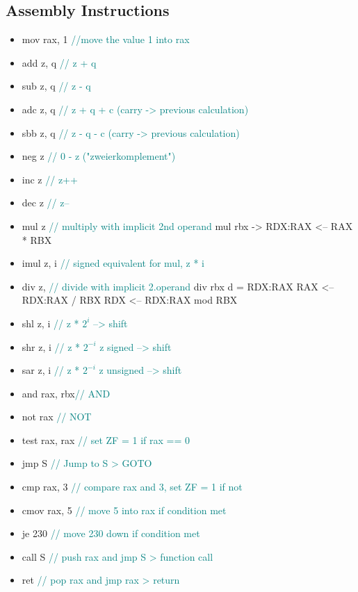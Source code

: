 \begin{multicols*}{4}
\subsection{Assembly Instructions}
\begin{itemize}
    \item mov rax, 1 \textcolor{teal}{//move the value 1 into rax}
    \item add z,   q  \textcolor{teal}{// z + q}
    \item sub z,   q  \textcolor{teal}{// z - q}
    \item adc z,   q  \textcolor{teal}{// z + q + c (carry -> previous calculation)}
    \item sbb z,   q  \textcolor{teal}{// z - q - c (carry -> previous calculation)}
    \item neg z       \textcolor{teal}{// 0 - z ("zweierkomplement")}
    \item inc z       \textcolor{teal}{// z++ }
    \item dec z       \textcolor{teal}{// z-- }
    \item mul z       \textcolor{teal}{// multiply with implicit 2nd operand }\newline
    mul rbx -> RDX:RAX <-- RAX * RBX
    \item imul z,   i  \textcolor{teal}{// signed equivalent for mul, z * i }
    \item div z,      \textcolor{teal}{// divide with implicit 2.operand}\newline
    div rbx  \newline
    d = RDX:RAX\newline
    RAX <-- RDX:RAX / RBX\newline
    RDX <-- RDX:RAX mod RBX
    \item shl z,   i  \textcolor{teal}{// z * \(2^i\)               --> shift}
    \item shr z,   i  \textcolor{teal}{// z * \(2^{-i}\) z signed   --> shift}
    \item sar z,   i  \textcolor{teal}{// z * \(2^{-i}\) z unsigned --> shift}
    \item and rax, rbx\textcolor{teal}{// AND}
    \item not rax     \textcolor{teal}{// NOT}
    \item test rax, rax \textcolor{teal}{// set ZF = 1 if rax == 0}
    \item jmp S       \textcolor{teal}{// Jump to S > GOTO}
    \item cmp rax, 3 \textcolor{teal}{// compare rax and 3, set ZF = 1 if not}
    \item cmov rax, 5 \textcolor{teal}{// move 5 into rax if condition met}
    \item je 230 \textcolor{teal}{// move 230 down if condition met}
    \item call S \textcolor{teal}{// push rax and jmp S > function call}
    \item ret    \textcolor{teal}{// pop rax and jmp rax > return}


\end{itemize}
\end{multicols*}
